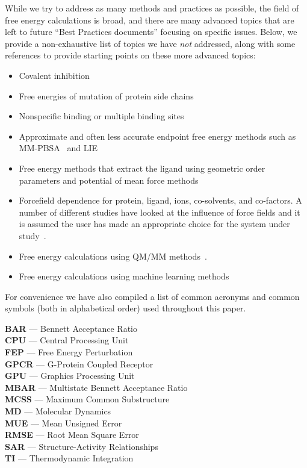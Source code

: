 \documentclass[9pt,bestpractices]{livecoms}
\begin{document}
While we try to address as many methods and practices as possible, the field of free energy calculations is broad, and there are many advanced topics that are left to future ``Best Practices documents'' focusing on specific issues. 
Below, we provide a non-exhaustive list of topics we have \emph{not} addressed, along with some references to provide starting points on these more advanced topics:
\begin{itemize}
\item Covalent inhibition~\cite{lameira2019predicting}
\item Free energies of mutation of protein side chains~\cite{gapsys2016accurate,aldeghi2018accurate}
\item Nonspecific binding or multiple binding sites~\cite{gill2018binding}
\item Approximate and often less accurate endpoint free energy methods such as MM-PBSA~\cite{genheden2015mm} and LIE~\cite{gutierrez-de-teran2012linear}
\item Free energy methods that extract the ligand using geometric order parameters and potential of mean force methods~\cite{heinzelmann2017attachpullrelease}
\item Forcefield dependence for protein, ligand, ions, co-solvents, and co-factors. A number of different studies have looked at the influence of force fields and it is assumed the user has made an appropriate choice for the system under study~\cite{loeffler2018reproducibility, vassetti2019assessment, lopes2015current, hahn2024current}. 
\item Free energy calculations using QM/MM methods~\cite{beierlein2011simple,dybeck2016comparison,cave-ayland2015direct,Schoeller2023}.
\item Free energy calculations using machine learning methods~\cite{rufa2020chemical, scheen2020hybrid, cole2020machine,Karwounopoulos2024}
\end{itemize}

For convenience we have also compiled a list of common acronyms and common symbols (both in alphabetical order) used throughout this paper.
\begin{tcolorbox}[title=Acronyms, colback=blue!10!white]
    {\bf BAR} --- Bennett Acceptance Ratio\\
    {\bf CPU} --- Central Processing Unit\\
     {\bf FEP} --- Free Energy Perturbation\\
     {\bf GPCR} --- G-Protein Coupled Receptor\\
     {\bf GPU} --- Graphics Processing Unit\\
     {\bf MBAR} --- Multistate Bennett Acceptance Ratio\\
     {\bf MCSS} --- Maximum Common Substructure\\
     {\bf MD} --- Molecular Dynamics\\
     {\bf MUE} --- Mean Unsigned Error\\
     {\bf RMSE} --- Root Mean Square Error\\
     {\bf SAR} --- Structure-Activity Relationships\\
     {\bf TI} --- Thermodynamic Integration
\end{tcolorbox}
\end{document}
